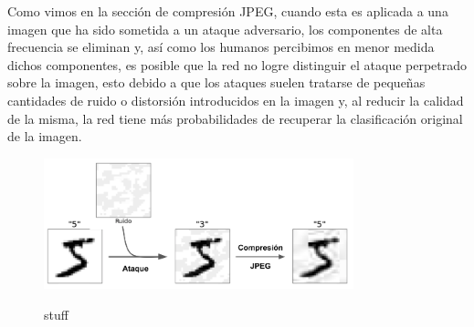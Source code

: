 Como vimos en la sección de compresión JPEG, cuando esta es aplicada a una imagen que ha sido sometida a un ataque adversario, los componentes de alta frecuencia se eliminan y, así como los humanos percibimos en menor medida dichos componentes, es posible que la red no logre distinguir el ataque perpetrado sobre la imagen, esto debido a que los ataques suelen tratarse de pequeñas cantidades de ruido o distorsión introducidos en la imagen y, al reducir la calidad de la misma, la red tiene más probabilidades de recuperar la clasificación original de la imagen.

\begin{figure}[h!]
    \centering
    \includegraphics[width=0.8\textwidth]{images/jpeg/jpegdefense_example.png}
    \label{jpegexample}
    \caption{stuff}
\end{figure}

